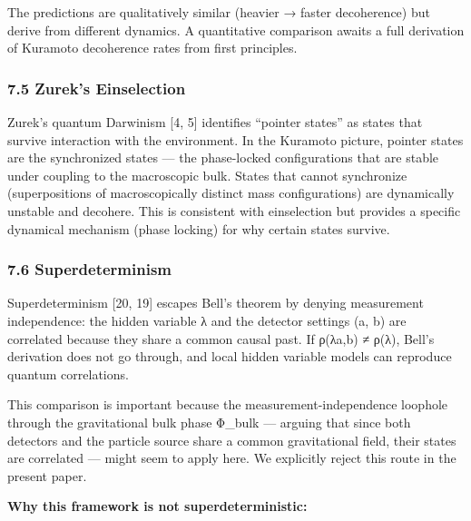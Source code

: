 \documentclass[
]{article}
\begin{document}
The predictions are qualitatively similar (heavier → faster decoherence)
but derive from different dynamics. A quantitative comparison awaits a
full derivation of Kuramoto decoherence rates from first principles.

\subsubsection{7.5 Zurek's Einselection}\label{zureks-einselection}

Zurek's quantum Darwinism {[}4, 5{]} identifies ``pointer states'' as
states that survive interaction with the environment. In the Kuramoto
picture, pointer states are the synchronized states --- the phase-locked
configurations that are stable under coupling to the macroscopic bulk.
States that cannot synchronize (superpositions of macroscopically
distinct mass configurations) are dynamically unstable and decohere.
This is consistent with einselection but provides a specific dynamical
mechanism (phase locking) for why certain states survive.

\subsubsection{7.6 Superdeterminism}\label{superdeterminism}

Superdeterminism {[}20, 19{]} escapes Bell's theorem by denying
measurement independence: the hidden variable λ and the detector
settings (a, b) are correlated because they share a common causal past.
If ρ(λ\textbar a,b) ≠ ρ(λ), Bell's derivation does not go through, and
local hidden variable models can reproduce quantum correlations.

This comparison is important because the measurement-independence
loophole through the gravitational bulk phase Φ\_bulk --- arguing that
since both detectors and the particle source share a common
gravitational field, their states are correlated --- might seem to apply
here. We explicitly reject this route in the present paper.

\textbf{Why this framework is not superdeterministic:}
\end{document}
